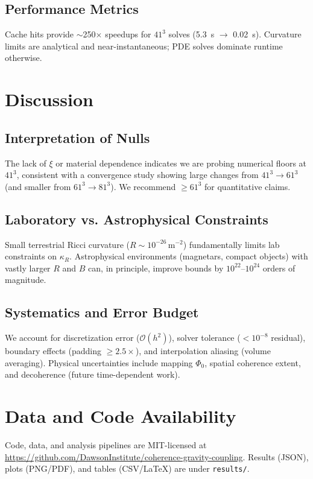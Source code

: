 \documentclass[10pt,twocolumn]{article}
\begin{document}
\subsection{Performance Metrics}
Cache hits provide $\sim$250$\times$ speedups for $41^3$ solves (5.3~s $\rightarrow$ 0.02~s). Curvature limits are analytical and near-instantaneous; PDE solves dominate runtime otherwise.

\section{Discussion}
\subsection{Interpretation of Nulls}
The lack of $\xi$ or material dependence indicates we are probing numerical floors at $41^3$, consistent with a convergence study showing large changes from $41^3\to61^3$ (and smaller from $61^3\to81^3$). We recommend $\ge 61^3$ for quantitative claims.

\subsection{Laboratory vs. Astrophysical Constraints}
Small terrestrial Ricci curvature ($R\sim10^{-26}\,\mathrm{m^{-2}}$) fundamentally limits lab constraints on $\kappa_R$. Astrophysical environments (magnetars, compact objects) with vastly larger $R$ and $B$ can, in principle, improve bounds by $10^{22}$--$10^{24}$ orders of magnitude.

\subsection{Systematics and Error Budget}
We account for discretization error ($\mathcal{O}(h^2)$), solver tolerance ($<10^{-8}$ residual), boundary effects (padding $\ge 2.5\times$), and interpolation aliasing (volume averaging). Physical uncertainties include mapping $\Phi_0$, spatial coherence extent, and decoherence (future time-dependent work).

\section{Data and Code Availability}
Code, data, and analysis pipelines are MIT-licensed at\: \url{https://github.com/DawsonInstitute/coherence-gravity-coupling}. Results (JSON), plots (PNG/PDF), and tables (CSV/LaTeX) are under \texttt{results/}. 
\end{document}
